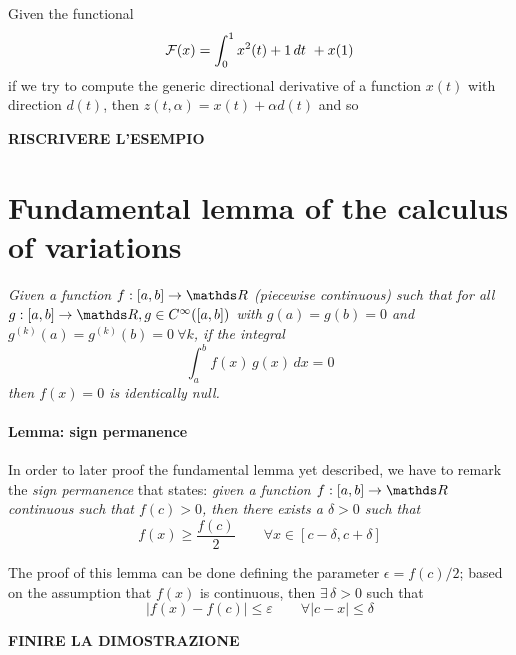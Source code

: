 	
	\begin{example}{}
		Given the functional
		\[ \mathcal{F}(x) = \int_0^1 x^2(t) + 1 \, dt  \ + x(1) \]
		if we try to compute the generic directional derivative of a function $x(t)$ with direction $d(t)$, then $z(t,\alpha) = x(t) + \alpha d(t)$ and so 
		
		\textbf{RISCRIVERE L'ESEMPIO} 
	\end{example}
	
\section{Fundamental lemma of the calculus of variations}
	{\itshape Given a function $f:[a,b]\rightarrow \R$ (piecewise continuous) such that for all $g:[a,b] \rightarrow \R, g \in C^\infty([a,b])$ with $g(a) = g(b) = 0$ and $g^{(k)}(a) = g^{(k)}(b) = 0 \ \forall k$, if the integral 
	\begin{equation} \label{eq:func:lemma}
		\int_a^b f(x)\,g(x) \, dx = 0
	\end{equation}
	then $f(x)= 0 $ is identically null. }

	\paragraph{Lemma: sign permanence} In order to later proof the fundamental lemma yet described, we have to remark the \textit{sign permanence} that states: {\itshape given a function $f:[a,b]\rightarrow \R$ continuous such that $f(c) >0$, then there exists a $\delta >0$ such that }
	\[ f(x) \geq \frac{f(c)}{2} \qquad \forall x \in [c-\delta,c+\delta] \]
	
	The proof of this lemma can be done defining the parameter $\epsilon = f(c) / 2$; based on the assumption that $f(x)$ is continuous, then $\exists\, \delta >0$ such that 
	\[ |f(x) - f(c)| \leq \varepsilon \qquad \forall |c-x|\leq \delta \]
	
	\textbf{FINIRE LA DIMOSTRAZIONE}
	
